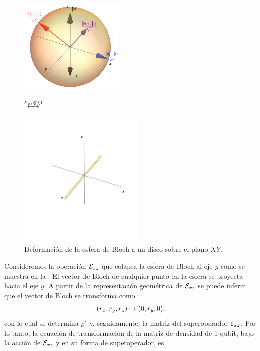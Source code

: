 \begin{figure} %
    \centering
    \begin{minipage}{.4\textwidth}
        \centering
        \includegraphics[width=5cm]
        {img-congreso/bloch.png}
    \end{minipage}
    $\stackrel{\E_{xz}\otimes\1 \vspace{1cm}}{\longmapsto}$
    \begin{minipage}{0.4\textwidth}
        \centering
        \includegraphics[width=6cm]
        {img-congreso/lineY}
    \end{minipage}
    \caption{Deformación de la esfera de Bloch a un disco sobre el plano $XY$.}
    \label{fig:QC-ex2}
\end{figure} %
Consideremos la operación $\mathcal{E}_{xz}$ que colapsa la esfera de Bloch
al eje $y$ como se muestra en la . El vector de 
Bloch de cualquier punto en la esfera se proyecta hacia el eje $y$.
A partir de la representación geométrica de $\mathcal{E}_{xz}$ 
se puede inferir que el vector de Bloch se transforma 
como
\begin{align}
\qty(r_x,r_y,r_z)\mapsto\qty(0,r_y,0),
\label{eq:Bloch-vec-mapToY}
\end{align}
con lo cual se determina $\rho'$ y, seguidamente,
la matriz del superoperador $\mathcal{E}_{xz}$.
Por lo tanto, la ecuación de transformación de la matriz 
de densidad de 1 qubit, bajo la acción de $\mathcal{E}_{xz}$ y 
en su forma de superoperador, es
